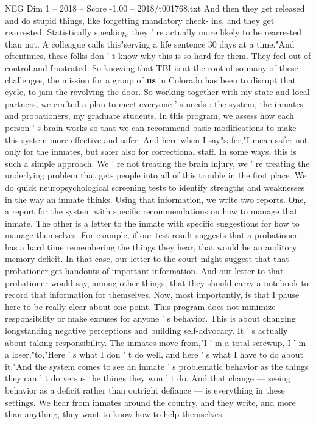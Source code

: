 \begin{textsample}{NEG Dim 1 – 2018 – Score -1.00 – 2018/t001768.txt}
And then they get released and do stupid things, like forgetting mandatory check- ins, and they get rearrested.
Statistically speaking, they ' re actually more likely to be rearrested than not.
A colleague calls this"serving a life sentence 30 days at a time."And oftentimes, these folks don ' t know why this is so hard for them.
They feel out of control and frustrated.
So knowing that TBI is at the root of so many of these challenges, the mission for a group of \textbf{us} in Colorado has been to disrupt that cycle, to jam the revolving the door.
So working together with my state and local partners, we crafted a plan to meet everyone ' s needs : the system, the inmates and probationers, my graduate students.
In this program, we assess how each person ' s brain works so that we can recommend basic modifications to make this system more effective and safer.
And here when I say"safer,"I mean safer not only for the inmates, but safer also for correctional staff.
In some ways, this is such a simple approach.
We ' re not treating the brain injury, we ' re treating the underlying problem that gets people into all of this trouble in the first place.
We do quick neuropsychological screening tests to identify strengths and weaknesses in the way an inmate thinks.
Using that information, we write two reports.
One, a report for the system with specific recommendations on how to manage that inmate.
The other is a letter to the inmate with specific suggestions for how to manage themselves.
For example, if our test result suggests that a probationer has a hard time remembering the things they hear, that would be an auditory memory deficit.
In that case, our letter to the court might suggest that that probationer get handouts of important information.
And our letter to that probationer would say, among other things, that they should carry a notebook to record that information for themselves.
Now, most importantly, is that I pause here to be really clear about one point.
This program does not minimize responsibility or make excuses for anyone ' s behavior.
This is about changing longstanding negative perceptions and building self-advocacy.
It ' s actually about taking responsibility.
The inmates move from,"I ' m a total screwup, I ' m a loser,"to,"Here ' s what I don ' t do well, and here ' s what I have to do about it."And the system comes to see an inmate ' s problematic behavior as the things they can ' t do versus the things they won ' t do.
And that change — seeing behavior as a deficit rather than outright defiance — is everything in these settings.
We hear from inmates around the country, and they write, and more than anything, they want to know how to help themselves.

\end{textsample}
